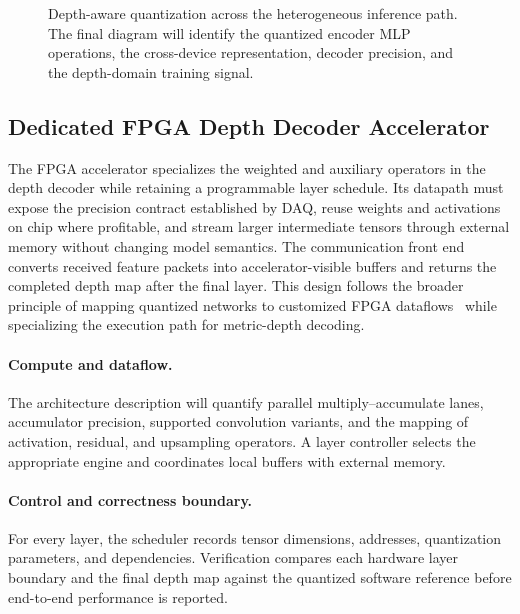 
\begin{figure}[t]
  \centering
  \caption{Depth-aware quantization across the heterogeneous inference path.
  The final diagram will identify the quantized encoder MLP operations, the
  cross-device representation, decoder precision, and the depth-domain
  training signal.}
  \label{fig:daq}
\end{figure}

\subsection{Dedicated FPGA Depth Decoder Accelerator}
\label{sec:accelerator}

The FPGA accelerator specializes the weighted and auxiliary operators in the
depth decoder while retaining a programmable layer schedule.  Its datapath
must expose the precision contract established by DAQ, reuse weights and
activations on chip where profitable, and stream larger intermediate tensors
through external memory without changing model semantics.  The communication
front end converts received feature packets into accelerator-visible buffers
and returns the completed depth map after the final layer.  This design follows
the broader principle of mapping quantized networks to customized FPGA
dataflows~\cite{umuroglu2017finn} while specializing the execution path for
metric-depth decoding.

\paragraph{Compute and dataflow.}
The architecture description will quantify parallel multiply--accumulate
lanes, accumulator precision, supported convolution variants, and the mapping
of activation, residual, and upsampling operators.  A layer controller selects
the appropriate engine and coordinates local buffers with external memory.

\paragraph{Control and correctness boundary.}
For every layer, the scheduler records tensor dimensions, addresses,
quantization parameters, and dependencies.  Verification compares each
hardware layer boundary and the final depth map against the quantized software
reference before end-to-end performance is reported.
